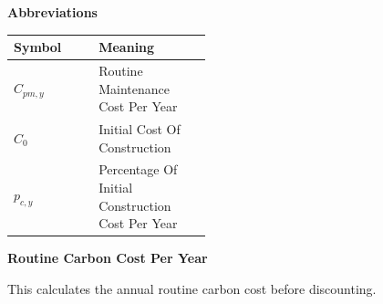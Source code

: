 \documentclass{article}
\begin{document}
\vspace{0.4em}
\textbf{Abbreviations}\par\vspace{-0.35em}
\begin{tabularx}{\linewidth}{>{\raggedright\arraybackslash}p{0.43\linewidth} >{\raggedright\arraybackslash}X}
\toprule
Symbol & Meaning \\
\midrule
$C_{pm,y}$ & Routine Maintenance Cost Per Year \\
$C_0$ & Initial Cost Of Construction \\
$p_{c,y}$ & Percentage Of Initial Construction Cost Per Year \\
\bottomrule
\end{tabularx}
\vspace{0.6em}
\vspace{0.4em}
\textbf{Routine Carbon Cost Per Year}\par\vspace{-0.35em}
This calculates the annual routine carbon cost before discounting.
\end{document}
